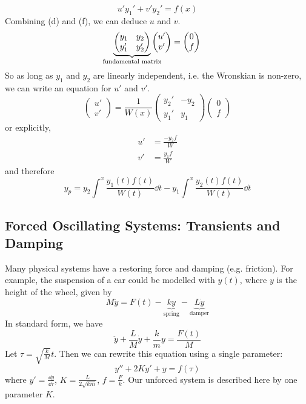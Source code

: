 \documentclass{article}
\begin{document}
\[ u'y_1' + v'y_2' = f(x) \tag{f} \]
Combining (d) and (f), we can deduce $u$ and $v$.
\[ \underbrace{\begin{pmatrix}
            y_1 & y_2 \\ y_1' & y_2'
        \end{pmatrix}}_{\mathclap{\text{fundamental matrix}}} \begin{pmatrix}
        u' \\ v'
    \end{pmatrix} = \begin{pmatrix}
        0 \\ f
    \end{pmatrix} \]
So as long as $y_1$ and $y_2$ are linearly independent, i.e. the Wronskian is non-zero, we can write an equation for $u'$ and $v'$.
\[
    \begin{pmatrix}
        u' \\ v'
    \end{pmatrix} = \frac{1}{W(x)}\begin{pmatrix}
        y_2' & -y_2 \\ y_1' & y_1
    \end{pmatrix} \begin{pmatrix}
        0 \\ f
    \end{pmatrix}
\]
or explicitly,
\begin{align*}
    u' & = \frac{-y_2 f}{W} \\
    v' & = \frac{y_1 f}{W}
\end{align*}
and therefore
\[ y_p = y_2 \int^x \frac{y_1(t) f(t)}{W(t)}\dd{t} - y_1 \int^x \frac{y_2(t) f(t)}{W(t)}\dd{t} \]

\subsection{Forced Oscillating Systems: Transients and Damping}
Many physical systems have a restoring force and damping (e.g. friction). For example, the suspension of a car could be modelled with $y(t)$, where $y$ is the height of the wheel, given by
\[ M\ddot y = F(t) - \underbrace{ky}_{\text{spring}} - \underbrace{L\dot y}_{\text{damper}} \]
In standard form, we have
\[ \ddot y + \frac{L}{M} \dot y + \frac{k}{m} y = \frac{F(t)}{M} \]
Let $\tau = \sqrt{\frac{k}{M}} t$. Then we can rewrite this equation using a single parameter:
\[ y'' + 2Ky' + y = f(\tau) \]
where $y' = \frac{\dd{y}}{\dd \tau}$, $K = \frac{L}{2\sqrt{km}}$, $f = \frac{F}{k}$.
Our unforced system is described here by one parameter $K$.
\end{document}
